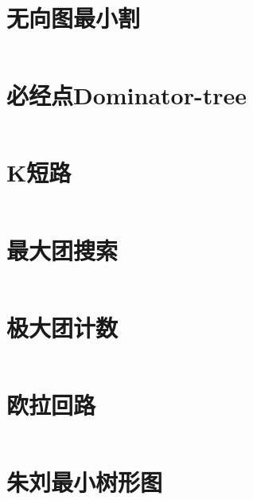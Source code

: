 \section{无向图最小割}
\inputminted{cpp}{\source/graph-theory/StoerWagner_O(V^3).cpp}
\section{必经点Dominator-tree}
\inputminted{cpp}{\source/graph-theory/dominator.cpp}
\section{K短路}
\inputminted{cpp}{\source/graph-theory/Kth-minimum-path.cpp}
\section{最大团搜索}
\inputminted{cpp}{\source/graph-theory/最大团搜索.cpp}
\section{极大团计数}
\inputminted{cpp}{\source/graph-theory/极大团计数.cpp}
\section{欧拉回路}
\inputminted{cpp}{\source/graph-theory/euler-tour.cpp}
\section{朱刘最小树形图}
\inputminted{cpp}{\source/graph-theory/minimum_arborescence.cpp}
